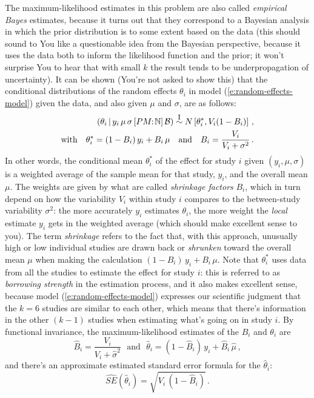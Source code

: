 \documentclass[12pt]{article}
\newcommand{\given}{\, | \,}
\begin{document}
The maximum-likelihood estimates in this problem are also called \textit{empirical Bayes} estimates, because it turns out that they correspond to a Bayesian analysis in which the prior distribution is to some extent based on the data (this should sound to You like a questionable idea from the Bayesian perspective, because it uses the data both to inform the likelihood function and the prior; it won't surprise You to hear that with small $k$ the result tends to be underpropagation of uncertainty). It can be shown (You're not asked to show this) that the conditional distributions of the random effects $\theta_i$ in model (\ref{e:random-effects-model}) given the data, and also given $\mu$ and $\sigma$, are as follows:
\begin{eqnarray} \label{e:shrinkage-1}
( \theta_i \given y_i \, \mu \, \sigma \, [ PM \! \! : \! \mathbb{ N } ] \, \mathcal{ B } ) \stackrel{ \textrm{\footnotesize I} }{ \sim } N \left[ \theta_i^*, V_i ( 1 - B_i ) \right] \, , \nonumber \\ \textrm{with} \ \ \ \theta_i^* = ( 1 - B_i ) \, y_i + B_i \, \mu \ \ \ \textrm{and} \ \ \ B_i = \frac{ V_i }{ V_i + \sigma^2 } \, .
\end{eqnarray}
In other words, the conditional mean $\theta_i^*$ of the effect for study $i$ given $( y_i,  \mu, \sigma )$ is a weighted average of the sample mean for that study, $y_i$, and the overall mean $\mu$. The weights are given by what are called \textit{shrinkage factors} $B_i$, which in turn depend on how the variability $V_i$ within study $i$ compares to the between-study variability $\sigma^2$: the more accurately $y_i$ estimates $\theta_i$, the more weight the \textit{local} estimate $y_i$ gets in the weighted average (which should make excellent sense to you). The term \textit{shrinkage} refers to the fact that, with this approach, unusually high or low individual studies are drawn back or \textit{shrunken} toward the overall mean $\mu$ when making the calculation $( 1 - B_i ) \, y_i + B_i \, \mu$. Note that $\theta_i^*$ uses data from all the studies to estimate the effect for study $i$: this is referred to as \textit{borrowing strength} in the estimation process, and it also makes excellent sense, because model (\ref{e:random-effects-model}) expresses our scientific judgment that the $k = 6$ studies are similar to each other, which means that there's information in the other $( k - 1 )$ studies when estimating what's going on in study $i$. By functional invariance, the maximum-likelihood estimates of the $B_i$ and $\theta_i$ are
\begin{equation} \label{e:shrinkage-2}
\hat{ B }_i = \frac{ V_i }{ V_i + \hat{ \sigma }^2 } \ \ \ \textrm{and} \ \ \ \hat{ \theta }_i = ( 1 - \hat{ B }_i ) \, y_i + \hat{ B }_i \, \hat{ \mu } \, ,
\end{equation}
and there's an approximate estimated standard error formula for the $\hat{ \theta }_i$:
\begin{equation} \label{e:shrinkage-3}
\widehat{ SE } \left( \hat{ \theta }_i \right) = \sqrt{ V_i \, ( 1 - \hat{ B }_i ) } \, .
\end{equation}
\end{document}
